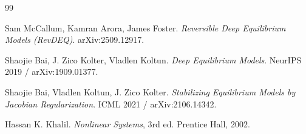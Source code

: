 \documentclass[11pt]{article}
\begin{document}
\begin{thebibliography}{99}

Sam McCallum, Kamran Arora, James Foster.
\newblock \emph{Reversible Deep Equilibrium Models (RevDEQ)}.
\newblock arXiv:2509.12917.

Shaojie Bai, J. Zico Kolter, Vladlen Koltun.
\newblock \emph{Deep Equilibrium Models}.
\newblock NeurIPS 2019 / arXiv:1909.01377.

Shaojie Bai, Vladlen Koltun, J. Zico Kolter.
\newblock \emph{Stabilizing Equilibrium Models by Jacobian Regularization}.
\newblock ICML 2021 / arXiv:2106.14342.

Hassan K. Khalil.
\newblock \emph{Nonlinear Systems}, 3rd ed.
\newblock Prentice Hall, 2002.

\end{thebibliography}
\end{document}
